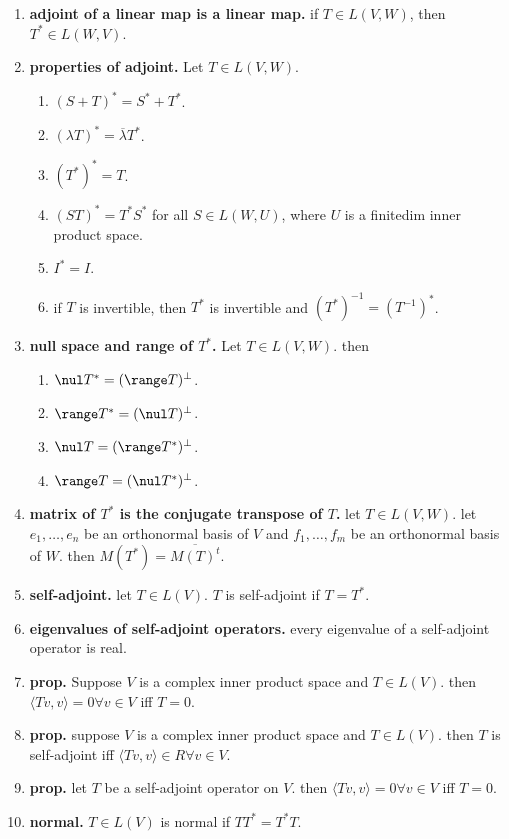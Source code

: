 \begin{enumerate}
	\item \textbf{adjoint of a linear map is a linear map. } if $T \in L(V,W)$, then $T^* \in L(W,V)$. 
	\item \textbf{properties of adjoint. } Let $T \in L(V,W)$. 
	\begin{enumerate}
		\item $(S+T)^* = S^*+T^*$. 
		\item $(\lambda T)^* = \overline{\lambda}T^*$. 
		\item $(T^*)^*=T$. 
		\item $(ST)^* = T^*S^*$ for all $S \in L(W,U)$, where $U$ is a finitedim inner product space. 
		\item $I^*=I$. 
		\item if $T$ is invertible, then $T^*$ is invertible and $(T^*)^{-1} = (T^{-1})^*$.
	\end{enumerate}
	\item \textbf{null space and range of $T^*$. } Let $T \in L(V,W)$. then 
	\begin{enumerate}
		\item $\nul T^* = (\range T)^\perp$. 
		\item $\range T^* = (\nul T)^\perp$. 
		\item $\nul T = (\range T^*)^\perp$. 
		\item $\range T = (\nul T^*)^\perp$. 
	\end{enumerate}
	\item \textbf{matrix of $T^*$ is the conjugate transpose of $T$. } let $T \in L(V,W)$. let $e_1,\dots,e_n$ be an orthonormal basis of $V$ and $f_1,\dots,f_m$ be an orthonormal basis of $W$. then $M(T^*) = \overline{M(T)^t}$. 
	\item \textbf{self-adjoint. } let $T \in L(V)$. $T$ is self-adjoint if $T=T^*$. 
	\item \textbf{eigenvalues of self-adjoint operators. } every eigenvalue of a self-adjoint operator is real. 
	\item \textbf{prop. } Suppose $V$ is a complex inner product space and $T \in L(V)$. then $\langle Tv,v \rangle = 0 \forall v \in V$ iff $T=0$. 
	\item \textbf{prop. } suppose $V$ is a complex inner product space and $T \in L(V)$. then $T$ is self-adjoint iff $\langle Tv,v \rangle \in R \forall v \in V$. 
	\item \textbf{prop. } let $T$ be a self-adjoint operator on $V$. then $\langle Tv,v \rangle = 0 \forall v \in V$ iff $T=0$. 
	\item \textbf{normal. } $T \in L(V)$ is normal if $TT^* = T^*T$. 

\end{enumerate}
